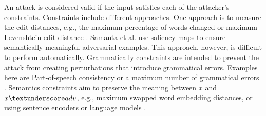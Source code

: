     An attack is considered valid if the input satisfies each of the attacker's constraints. 
    Constraints include different approaches. One approach is to measure the edit distances, e.g., the maximum percentage of words changed \cite{ebrahimi2017hotflip} or maximum Levenshtein edit distance \cite{gao2018black}. Samanta et al. use saliency maps to ensure semantically meaningful adversarial examples\cite{samanta2017towards}. This approach, however, is difficult to perform automatically. Grammatically constraints are intended to prevent the attack from creating perturbations that introduce grammatical errors. Examples here are Part-of-speech consistency or a maximum number of grammatical errors \cite{ebrahimi2017hotflip, jin2019bert}. Semantics constraints aim to preserve the meaning between $x$ and $x\textunderscore adv$, e.g., maximum swapped word embedding distances, or using sentence encoders or language models \cite{cer2018universal, garg2020bae, jin2019bert, li2018textbugger, alzantot2018generating, ebrahimi2017hotflip}.




